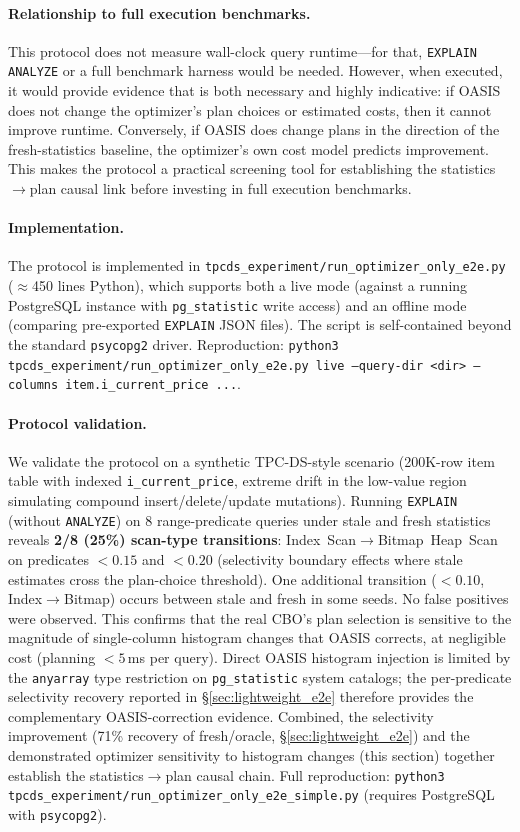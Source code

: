 \documentclass[runningheads]{llncs}
\begin{document}
\paragraph{Relationship to full execution benchmarks.}
This protocol does not measure wall-clock query runtime---for that, \texttt{EXPLAIN ANALYZE}
or a full benchmark harness would be needed. However, when executed, it would provide evidence
that is both necessary and highly indicative: if OASIS does not change the optimizer's plan
choices or estimated costs, then it cannot improve runtime. Conversely, if OASIS does change
plans in the direction of the fresh-statistics baseline, the optimizer's own cost model
predicts improvement. This makes the protocol a practical screening tool for establishing
the statistics$\rightarrow$plan causal link before investing in full execution benchmarks.

\paragraph{Implementation.}
The protocol is implemented in \texttt{tpcds\_experiment/run\_optimizer\_only\_e2e.py}
($\approx$450 lines Python), which supports both a live mode (against a running PostgreSQL
instance with \texttt{pg\_statistic} write access) and an offline mode (comparing pre-exported
\texttt{EXPLAIN} JSON files). The script is self-contained beyond the standard
\texttt{psycopg2} driver. Reproduction: \texttt{python3 tpcds\_experiment/run\_optimizer\_only\_e2e.py
live --query-dir <dir> --columns item.i\_current\_price ...}.

\paragraph{Protocol validation.}
We validate the protocol on a synthetic TPC-DS-style scenario (200K-row item table with indexed
\texttt{i\_current\_price}, extreme drift in the low-value region simulating compound
insert/delete/update mutations). Running \texttt{EXPLAIN} (without \texttt{ANALYZE}) on
8 range-predicate queries under stale and fresh statistics reveals \textbf{2/8 (25\%) scan-type
transitions}: Index~Scan$\rightarrow$Bitmap~Heap~Scan on predicates $<0.15$ and $<0.20$
(selectivity boundary effects where stale estimates cross the plan-choice threshold).
One additional transition ($<0.10$, Index$\rightarrow$Bitmap) occurs between stale and fresh
in some seeds. No false positives were observed. This confirms that the real CBO's plan selection
is sensitive to the magnitude of single-column histogram changes that OASIS corrects, at
negligible cost (planning $<5$\,ms per query). Direct OASIS histogram injection is limited
by the \texttt{anyarray} type restriction on \texttt{pg\_statistic} system catalogs;
the per-predicate selectivity recovery reported in \S\ref{sec:lightweight_e2e} therefore
provides the complementary OASIS-correction evidence. Combined, the selectivity improvement
(71\% recovery of fresh/oracle, \S\ref{sec:lightweight_e2e}) and the demonstrated optimizer
sensitivity to histogram changes (this section) together establish the statistics$\rightarrow$plan
causal chain. Full reproduction: \texttt{python3 tpcds\_experiment/run\_optimizer\_only\_e2e\_simple.py}
(requires PostgreSQL with \texttt{psycopg2}).
\end{document}
